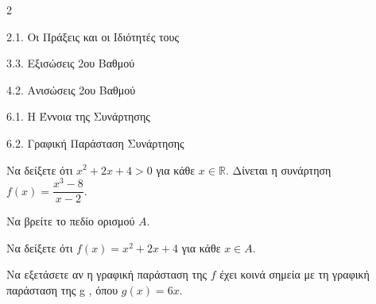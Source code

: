 \begin{ylh}{2}
    \item 2.1. Οι Πράξεις και οι Ιδιότητές τους
    \item 3.3. Εξισώσεις 2ου Βαθμού
    \item 4.2. Ανισώσεις 2ου Βαθμού
    \item 6.1. Η Έννοια της Συνάρτησης
    \item 6.2. Γραφική Παράσταση Συνάρτησης
\end{ylh}

\begin{alist}
\item Να δείξετε ότι $x^2 + 2x + 4 > 0$ για κάθε $x \in \mathbb{R}$.
Δίνεται η συνάρτηση $f(x) = \dfrac{x^3-8}{x-2}$.

\item Να βρείτε το πεδίο ορισμού $A$.
\item Να δείξετε ότι $f(x) = x^2 + 2x + 4$ για κάθε $x \in A$.
\item Να εξετάσετε αν η γραφική παράσταση της $f$ έχει κοινά σημεία με τη γραφική παράσταση της g , όπου $g(x) = 6x$.
\end{alist}

